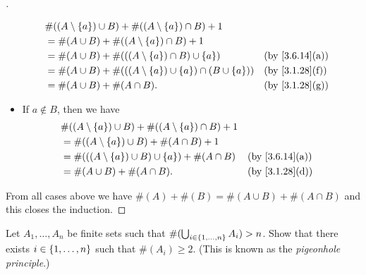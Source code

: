 \begin{proof}[]
\begin{itemize}
\begin{align*}
			       & \#((A \setminus \set{a}) \cup B) + \#((A \setminus \set{a}) \cap B) + 1                                           \\
			       & = \#(A \cup B) + \#((A \setminus \set{a}) \cap B) + 1                                                             \\
			       & = \#(A \cup B) + \#(((A \setminus \set{a}) \cap B) \cup \set{a})                &  & \text{(by \cref{3.6.14}(a))} \\
			       & = \#(A \cup B) + \#(((A \setminus \set{a}) \cup \set{a}) \cap (B \cup \set{a})) &  & \text{(by \cref{3.1.28}(f))} \\
			       & = \#(A \cup B) + \#(A \cap B).                                                  &  & \text{(by \cref{3.1.28}(g))}
		      \end{align*}
		\item If \(a \notin B\), then we have
		      \begin{align*}
			       & \#((A \setminus \set{a}) \cup B) + \#((A \setminus \set{a}) \cap B) + 1                                   \\
			       & = \#((A \setminus \set{a}) \cup B) + \#(A \cap B) + 1                                                     \\
			       & = \#(((A \setminus \set{a}) \cup B) \cup \set{a}) + \#(A \cap B)        &  & \text{(by \cref{3.6.14}(a))} \\
			       & = \#(A \cup B) + \#(A \cap B).                                          &  & \text{(by \cref{3.1.28}(d))}
		      \end{align*}
	\end{itemize}
	From all cases above we have \(\#(A) + \#(B) = \#(A \cup B) + \#(A \cap B)\) and this closes the induction.
\end{proof}

\begin{ex}\label{ex:3.6.10}
	Let \(A_1, \dots, A_n\) be finite sets such that \(\#(\bigcup_{i \in \left\lbrace1, \dots, n\right\rbrace} A_i) > n\).
	Show that there exists \(i \in \left\lbrace1, \dots, n\right\rbrace\) such that \(\#(A_i) \geq 2\).
	(This is known as the \emph{pigeonhole principle}.)
\end{ex}


